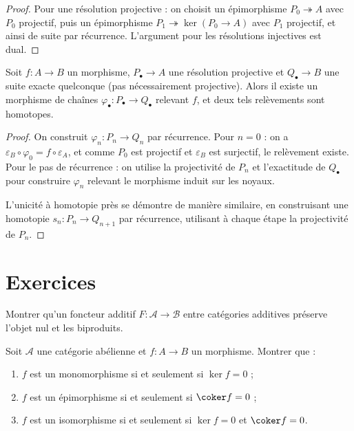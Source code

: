 \begin{proof}
Pour une résolution projective : on choisit un épimorphisme
$P_0 \twoheadrightarrow A$ avec $P_0$ projectif, puis un épimorphisme
$P_1 \twoheadrightarrow \ker(P_0 \to A)$ avec $P_1$ projectif, et
ainsi de suite par récurrence. L'argument pour les résolutions
injectives est dual.
\end{proof}

\begin{theoreme}\label{thm:comparison-lemma}
Soit $f \colon A \to B$ un morphisme, $P_\bullet \to A$ une résolution
projective et $Q_\bullet \to B$ une suite exacte quelconque (pas
nécessairement projective). Alors il existe un morphisme de chaînes
$\varphi_\bullet \colon P_\bullet \to Q_\bullet$ relevant $f$, et
deux tels relèvements sont homotopes.
\end{theoreme}

\begin{proof}
On construit $\varphi_n \colon P_n \to Q_n$ par récurrence.
Pour $n = 0$ : on a $\varepsilon_B \circ \varphi_0 = f \circ \varepsilon_A$,
et comme $P_0$ est projectif et $\varepsilon_B$ est surjectif, le
relèvement existe. Pour le pas de récurrence : on utilise la
projectivité de $P_n$ et l'exactitude de $Q_\bullet$ pour construire
$\varphi_n$ relevant le morphisme induit sur les noyaux.

L'unicité à homotopie près se démontre de manière similaire, en
construisant une homotopie $s_n \colon P_n \to Q_{n+1}$ par
récurrence, utilisant à chaque étape la projectivité de $P_n$.
\end{proof}


\section{Exercices}\label{sec:exos-abelian}

\begin{exercice}\label{exo:additive-functor-zero}
Montrer qu'un foncteur additif $F \colon \mathcal{A} \to \mathcal{B}$
entre catégories additives préserve l'objet nul et les biproduits.
\end{exercice}

\begin{exercice}\label{exo:abelian-mono-epi}
Soit $\mathcal{A}$ une catégorie abélienne et $f \colon A \to B$ un
morphisme. Montrer que :
\begin{enumerate}[label=(\alph*)]
\item $f$ est un monomorphisme si et seulement si $\ker f = 0$ ;
\item $f$ est un épimorphisme si et seulement si $\coker f = 0$ ;
\item $f$ est un isomorphisme si et seulement si $\ker f = 0$ et
  $\coker f = 0$.
\end{enumerate}
\end{exercice}

